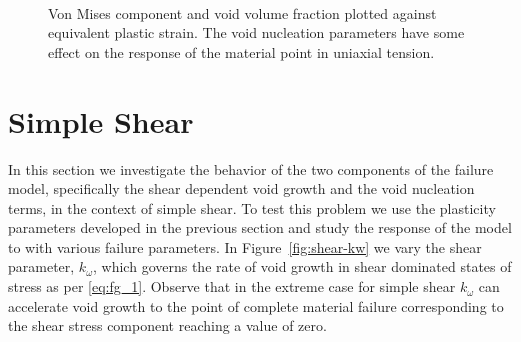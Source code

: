 \begin{figure}[htbp]
  \begin{center}
    ~ 
    \caption{Von Mises component and void volume fraction plotted
      against equivalent plastic strain. The void nucleation
      parameters have some effect on the response of the
      material point in uniaxial tension.}
    \label{fig:tension-nuc}
  \end{center}
\end{figure}

\section{Simple Shear}
\label{simple-shear}

In this section we investigate the behavior of the two components of
the failure model, specifically the shear dependent void growth and
the void nucleation terms, in the context of simple shear. To test
this problem we use the plasticity parameters developed in the
previous section and study the response of the model to with various
failure parameters. In Figure~\ref{fig:shear-kw} we vary the shear
parameter, $k_{\omega}$, which governs the rate of void growth in
shear dominated states of stress as per \eqref{eq:fg_1}. Observe that
in the extreme case for simple shear $k_{\omega}$ can accelerate void
growth to the point of complete material failure corresponding to the
shear stress component reaching a value of zero.

